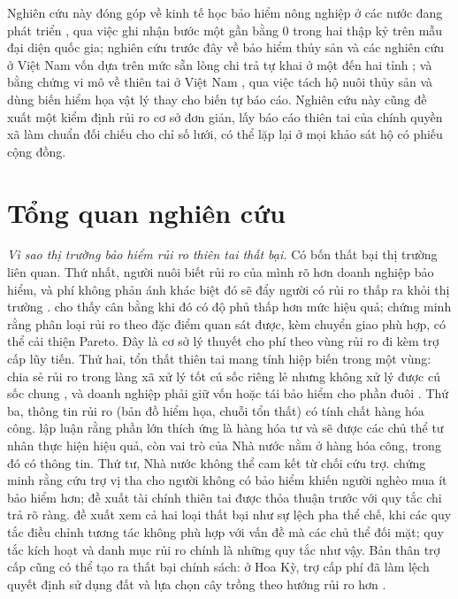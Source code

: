 \documentclass[12pt,a4paper]{article}
\begin{document}
Nghiên cứu này đóng góp về kinh tế học bảo hiểm nông nghiệp ở các nước đang phát triển \parencite{hazell1992,just1999,carter2017,jensen2016}, qua việc ghi nhận bước một gần bằng 0 trong hai thập kỷ trên mẫu đại diện quốc gia; nghiên cứu trước đây về bảo hiểm thủy sản \parencite{vananrooy2006,secretan2007,hobday2025} và các nghiên cứu ở Việt Nam vốn dựa trên mức sẵn lòng chi trả tự khai ở một đến hai tỉnh \parencite{khoi2014tom,nghi2016tom,nguyenkat2021,tu2025}; và bằng chứng vi mô về thiên tai ở Việt Nam \parencite{thomas2010,bui2014,arouri2015,hoang2024}, qua việc tách hộ nuôi thủy sản và dùng biến hiểm họa vật lý thay cho biến tự báo cáo. Nghiên cứu này cũng đề xuất một kiểm định rủi ro cơ sở đơn giản, lấy báo cáo thiên tai của chính quyền xã làm chuẩn đối chiếu cho chỉ số lưới, có thể lặp lại ở mọi khảo sát hộ có phiếu cộng đồng.

\section{Tổng quan nghiên cứu}
\label{sec:lit}

\textit{Vì sao thị trường bảo hiểm rủi ro thiên tai thất bại.} Có bốn thất bại thị trường liên quan. Thứ nhất, người nuôi biết rủi ro của mình rõ hơn doanh nghiệp bảo hiểm, và phí không phản ánh khác biệt đó sẽ đẩy người có rủi ro thấp ra khỏi thị trường \parencite{akerlof1970,rothschild1976}. \textcite{einav2011} cho thấy cân bằng khi đó có độ phủ thấp hơn mức hiệu quả; \textcite{crocker1986} chứng minh rằng phân loại rủi ro theo đặc điểm quan sát được, kèm chuyển giao phù hợp, có thể cải thiện Pareto. Đây là cơ sở lý thuyết cho phí theo vùng rủi ro đi kèm trợ cấp lũy tiến. Thứ hai, tổn thất thiên tai mang tính hiệp biến trong một vùng: chia sẻ rủi ro trong làng xã xử lý tốt cú sốc riêng lẻ nhưng không xử lý được cú sốc chung \parencite{townsend1994,dercon2002}, và doanh nghiệp phải giữ vốn hoặc tái bảo hiểm cho phần đuôi \parencite{kunreuther1996}. Thứ ba, thông tin rủi ro (bản đồ hiểm họa, chuỗi tổn thất) có tính chất hàng hóa công. \textcite{mendelsohn2000} lập luận rằng phần lớn thích ứng là hàng hóa tư và sẽ được các chủ thể tư nhân thực hiện hiệu quả, còn vai trò của Nhà nước nằm ở hàng hóa công, trong đó có thông tin. Thứ tư, Nhà nước không thể cam kết từ chối cứu trợ. \textcite{coate1995} chứng minh rằng cứu trợ vị tha cho người không có bảo hiểm khiến người nghèo mua ít bảo hiểm hơn; \textcite{clarkedercon2016} đề xuất tài chính thiên tai được thỏa thuận trước với quy tắc chi trả rõ ràng. \textcite{furton2019} đề xuất xem cả hai loại thất bại như sự lệch pha thể chế, khi các quy tắc điều chỉnh tương tác không phù hợp với vấn đề mà các chủ thể đối mặt; quy tắc kích hoạt và danh mục rủi ro chính là những quy tắc như vậy. Bản thân trợ cấp cũng có thể tạo ra thất bại chính sách: ở Hoa Kỳ, trợ cấp phí đã làm lệch quyết định sử dụng đất và lựa chọn cây trồng theo hướng rủi ro hơn \parencite{goodwin2013}.
\end{document}
